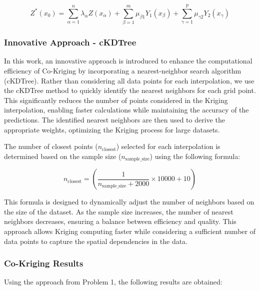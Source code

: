 \documentclass{swmcmthesis}
\begin{document}
\begin{equation}
Z^*(x_0) = \sum_{\alpha=1}^n \lambda_\alpha Z(x_\alpha) + \sum_{\beta=1}^m \mu_{\beta1} Y_1(x_{\beta}) + \sum_{\gamma=1}^p \mu_{\gamma2} Y_2(x_{\gamma}) 
\end{equation}

\subsubsection{Innovative Approach - cKDTree}

In this work, an innovative approach is introduced to enhance the computational efficiency of Co-Kriging by incorporating a nearest-neighbor search algorithm (cKDTree). Rather than considering all data points for each interpolation, we use the cKDTree method to quickly identify the nearest neighbors for each grid point. This significantly reduces the number of points considered in the Kriging interpolation, enabling faster calculations while maintaining the accuracy of the predictions. The identified nearest neighbors are then used to derive the appropriate weights, optimizing the Kriging process for large datasets.

The number of closest points ($n_{\text{closest}}$) selected for each interpolation is determined based on the sample size ($n_{\text{sample\_size}}$) using the following formula:

\begin{equation}
n_{\text{closest}} = \left(\frac{1}{n_\text{sample\_size}+2000} \times 10000 + 10 \right)
\end{equation}

This formula is designed to dynamically adjust the number of neighbors based on the size of the dataset. As the sample size increases, the number of nearest neighbors decreases, ensuring a balance between efficiency and quality. This approach allows Kriging computing faster while considering a sufficient number of data points to capture the spatial dependencies in the data.

\subsubsection{Co-Kriging Results}

Using the approach from Problem 1, the following results are obtained:
\end{document}
